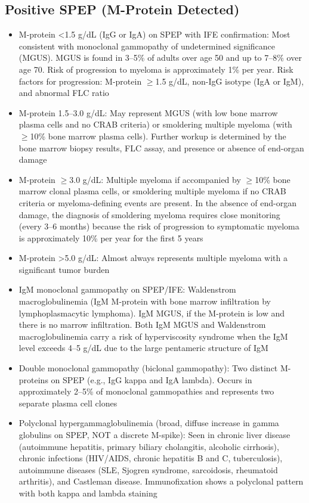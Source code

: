 \subsection*{Positive SPEP (M-Protein Detected)}
\begin{itemize}
  \item M-protein <1.5 g/dL (IgG or IgA) on SPEP with IFE confirmation: Most consistent with monoclonal gammopathy of undetermined significance (MGUS). MGUS is found in 3--5\% of adults over age 50 and up to 7--8\% over age 70. Risk of progression to myeloma is approximately 1\% per year. Risk factors for progression: M-protein $\geq$1.5 g/dL, non-IgG isotype (IgA or IgM), and abnormal FLC ratio
  \item M-protein 1.5--3.0 g/dL: May represent MGUS (with low bone marrow plasma cells and no CRAB criteria) or smoldering multiple myeloma (with $\geq$10\% bone marrow plasma cells). Further workup is determined by the bone marrow biopsy results, FLC assay, and presence or absence of end-organ damage
  \item M-protein $\geq$3.0 g/dL: Multiple myeloma if accompanied by $\geq$10\% bone marrow clonal plasma cells, or smoldering multiple myeloma if no CRAB criteria or myeloma-defining events are present. In the absence of end-organ damage, the diagnosis of smoldering myeloma requires close monitoring (every 3--6 months) because the risk of progression to symptomatic myeloma is approximately 10\% per year for the first 5 years
  \item M-protein >5.0 g/dL: Almost always represents multiple myeloma with a significant tumor burden
  \item IgM monoclonal gammopathy on SPEP/IFE: Waldenstrom macroglobulinemia (IgM M-protein with bone marrow infiltration by lymphoplasmacytic lymphoma). IgM MGUS, if the M-protein is low and there is no marrow infiltration. Both IgM MGUS and Waldenstrom macroglobulinemia carry a risk of hyperviscosity syndrome when the IgM level exceeds 4--5 g/dL due to the large pentameric structure of IgM
  \item Double monoclonal gammopathy (biclonal gammopathy): Two distinct M-proteins on SPEP (e.g., IgG kappa and IgA lambda). Occurs in approximately 2--5\% of monoclonal gammopathies and represents two separate plasma cell clones
  \item Polyclonal hypergammaglobulinemia (broad, diffuse increase in gamma globulins on SPEP, NOT a discrete M-spike): Seen in chronic liver disease (autoimmune hepatitis, primary biliary cholangitis, alcoholic cirrhosis), chronic infections (HIV/AIDS, chronic hepatitis B and C, tuberculosis), autoimmune diseases (SLE, Sjogren syndrome, sarcoidosis, rheumatoid arthritis), and Castleman disease. Immunofixation shows a polyclonal pattern with both kappa and lambda staining

\end{itemize}

